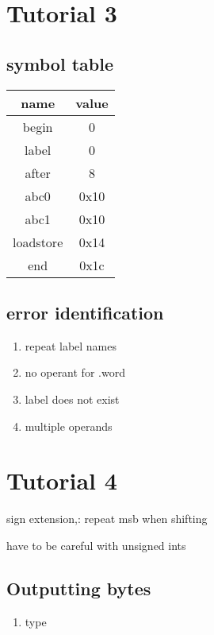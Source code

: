 \documentclass[11pt]{amsart}
\begin{document}
\section{Tutorial 3}
\subsection{symbol table}
\begin{tabular}{|c c|}
  \hline
  name & value \\
  \hline
  begin & 0\\
  label & 0\\
  after & 8\\
  abc0 & 0x10\\
  abc1 & 0x10\\
  loadstore &0x14\\
  end & 0x1c\\
  \hline
\end{tabular}
\subsection{error identification}
\begin{enumerate}
  \item repeat label names
  \item no operant for .word
  \item label does not exist
  \item multiple operands
\end{enumerate}
\section{Tutorial 4}
\par sign extension,: repeat msb when shifting
\par have to be careful with unsigned ints
\subsection{Outputting bytes}
\begin{enumerate}
  \item type
\end{enumerate}
\end{document}
